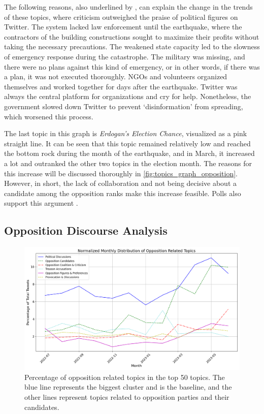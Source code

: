 The following reasons, also underlined by \textcite{cevik_aksoy_turkey_earthquake_2023}, can explain 
the change in the trends of these topics, where criticism outweighed the praise of political figures 
on Twitter. The system lacked law enforcement until the earthquake, where the 
contractors of the building constructions sought to maximize their profits without taking the 
necessary precautions. 
The weakened state capacity led to the slowness of emergency response during the catastrophe. 
The military was missing, and there were no plans against this kind of emergency, or in other words, 
if there was a plan, it was not executed thoroughly. 
NGOs and volunteers organized themselves and worked together for days after the earthquake. Twitter was always 
the central platform for organizations and cry for help. Nonetheless, the government slowed down 
Twitter to prevent `disinformation' from spreading, which worsened this process.

The last topic in this graph is \textit{Erdogan's Election Chance}, visualized as a pink straight line. 
It can be seen that this topic remained relatively low and reached the bottom rock during the month 
of the earthquake, and in March, it increased a lot and outranked the other two topics in the election 
month. The reasons for this increase will be discussed thoroughly in \autoref{fig:topics_graph_opposition}. 
However, in short, the lack of collaboration and not being decisive about a candidate among the 
opposition ranks make this increase feasible. Polls also support this 
argument \parencite{cevik_aksoy_turkey_earthquake_2023}.

\subsection{Opposition Discourse Analysis}

\begin{figure}[htb]
    \centering
    \includegraphics[width=\linewidth]{figures/normalized_opposition_selected_topics_distribution_with_styles.png}
    \caption[Normalized monthly distribution of opposition related topics]
    {Percentage of opposition related topics in the top 50 topics. 
    The blue line represents the biggest cluster and is the baseline, 
    and the other lines represent topics related to opposition parties and their candidates.}\label{fig:topics_graph_opposition}
\end{figure}

